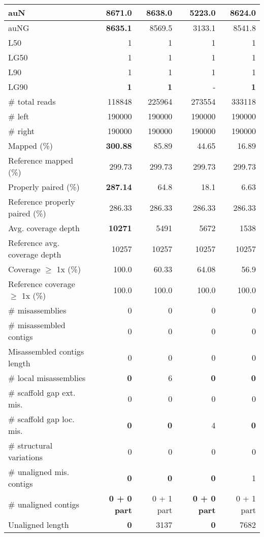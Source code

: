 \documentclass[12pt,a4paper]{article}
\begin{document}
\begin{table}[ht]
\begin{center}
\begin{tabular}{|l*{4}{|r}|}
auN & {\bf 8671.0} & 8638.0 & 5223.0 & 8624.0 \\ \hline
auNG & {\bf 8635.1} & 8569.5 & 3133.1 & 8541.8 \\ \hline
L50 & 1 & 1 & 1 & 1 \\ \hline
LG50 & 1 & 1 & 1 & 1 \\ \hline
L90 & 1 & 1 & 1 & 1 \\ \hline
LG90 & {\bf 1} & {\bf 1} & - & {\bf 1} \\ \hline
\# total reads & 118848 & 225964 & 273554 & 333118 \\ \hline
\# left & 190000 & 190000 & 190000 & 190000 \\ \hline
\# right & 190000 & 190000 & 190000 & 190000 \\ \hline
Mapped (\%) & {\bf 300.88} & 85.89 & 44.65 & 16.89 \\ \hline
Reference mapped (\%) & 299.73 & 299.73 & 299.73 & 299.73 \\ \hline
Properly paired (\%) & {\bf 287.14} & 64.8 & 18.1 & 6.63 \\ \hline
Reference properly paired (\%) & 286.33 & 286.33 & 286.33 & 286.33 \\ \hline
Avg. coverage depth & {\bf 10271} & 5491 & 5672 & 1538 \\ \hline
Reference avg. coverage depth & 10257 & 10257 & 10257 & 10257 \\ \hline
Coverage $\geq$ 1x (\%) & 100.0 & 60.33 & 64.08 & 56.9 \\ \hline
Reference coverage $\geq$ 1x (\%) & 100.0 & 100.0 & 100.0 & 100.0 \\ \hline
\# misassemblies & 0 & 0 & 0 & 0 \\ \hline
\# misassembled contigs & 0 & 0 & 0 & 0 \\ \hline
Misassembled contigs length & 0 & 0 & 0 & 0 \\ \hline
\# local misassemblies & {\bf 0} & 6 & {\bf 0} & {\bf 0} \\ \hline
\# scaffold gap ext. mis. & 0 & 0 & 0 & 0 \\ \hline
\# scaffold gap loc. mis. & {\bf 0} & {\bf 0} & 4 & {\bf 0} \\ \hline
\# structural variations & 0 & 0 & 0 & 0 \\ \hline
\# unaligned mis. contigs & {\bf 0} & {\bf 0} & {\bf 0} & 1 \\ \hline
\# unaligned contigs & {\bf 0 + 0 part} & 0 + 1 part & {\bf 0 + 0 part} & 0 + 1 part \\ \hline
Unaligned length & {\bf 0} & 3137 & {\bf 0} & 7682 \\ \hline

\end{tabular}
\end{center}
\end{table}
\end{document}

